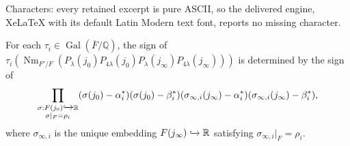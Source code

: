 \documentclass[10pt,a4paper]{amsart}
\DeclareMathOperator{\Gal}{Gal}
\DeclareMathOperator{\Nm}{Nm}
\newcommand{\bQ}{\mathbb{Q}}
\newcommand{\bR}{\mathbb{R}}
\begin{document}
Characters: every retained excerpt is pure ASCII, so the delivered engine, XeLaTeX with its default Latin Modern text font, reports no missing character.
\begin{lemma}
    For each $\tau_i \in \Gal(\overline{F}/\bQ)$, the sign of $\tau_i(\Nm_{F'/F}(P_{\lambda}(j_0)P_{4\lambda}(j_0)P_{\lambda}(j_\infty)P_{4\lambda}(j_\infty)))$ is determined by the sign of $$\prod_{\substack{\sigma: F(j_0)\xhookrightarrow{}\bR \\ \sigma|_{F} = \rho_i}}(\sigma(j_0) - \alpha_{i}^*)(\sigma(j_0)- \beta_i^*)(\sigma_{\infty,i}(j_\infty) - \alpha_{i}^*)(\sigma_{\infty,i}(j_\infty)- \beta_i^*),$$
    where $\sigma_{\infty,i}$ is the unique embedding $ F(j_{\infty}) \xhookrightarrow{} \bR$ satisfying $\sigma_{\infty,i}|_F = \rho_i$. 
\end{lemma}
\end{document}
